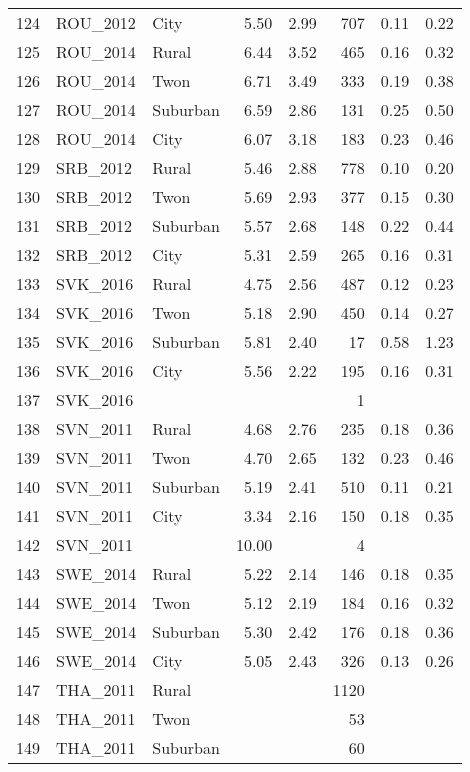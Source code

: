 \documentclass[12pt, titlepage]{article}
\begin{document}
\begin{table}[ht]
\begin{tabular}{rllrrrrr}
		124 & ROU\_2012 & City & 5.50 & 2.99 & 707 & 0.11 & 0.22 \\ 
		125 & ROU\_2014 & Rural & 6.44 & 3.52 & 465 & 0.16 & 0.32 \\ 
		126 & ROU\_2014 & Twon & 6.71 & 3.49 & 333 & 0.19 & 0.38 \\ 
		127 & ROU\_2014 & Suburban & 6.59 & 2.86 & 131 & 0.25 & 0.50 \\ 
		128 & ROU\_2014 & City & 6.07 & 3.18 & 183 & 0.23 & 0.46 \\ 
		129 & SRB\_2012 & Rural & 5.46 & 2.88 & 778 & 0.10 & 0.20 \\ 
		130 & SRB\_2012 & Twon & 5.69 & 2.93 & 377 & 0.15 & 0.30 \\ 
		131 & SRB\_2012 & Suburban & 5.57 & 2.68 & 148 & 0.22 & 0.44 \\ 
		132 & SRB\_2012 & City & 5.31 & 2.59 & 265 & 0.16 & 0.31 \\ 
		133 & SVK\_2016 & Rural & 4.75 & 2.56 & 487 & 0.12 & 0.23 \\ 
		134 & SVK\_2016 & Twon & 5.18 & 2.90 & 450 & 0.14 & 0.27 \\ 
		135 & SVK\_2016 & Suburban & 5.81 & 2.40 &  17 & 0.58 & 1.23 \\ 
		136 & SVK\_2016 & City & 5.56 & 2.22 & 195 & 0.16 & 0.31 \\ 
		137 & SVK\_2016 &  &  &  &   1 &  &  \\ 
		138 & SVN\_2011 & Rural & 4.68 & 2.76 & 235 & 0.18 & 0.36 \\ 
		139 & SVN\_2011 & Twon & 4.70 & 2.65 & 132 & 0.23 & 0.46 \\ 
		140 & SVN\_2011 & Suburban & 5.19 & 2.41 & 510 & 0.11 & 0.21 \\ 
		141 & SVN\_2011 & City & 3.34 & 2.16 & 150 & 0.18 & 0.35 \\ 
		142 & SVN\_2011 &  & 10.00 &  &   4 &  &  \\ 
		143 & SWE\_2014 & Rural & 5.22 & 2.14 & 146 & 0.18 & 0.35 \\ 
		144 & SWE\_2014 & Twon & 5.12 & 2.19 & 184 & 0.16 & 0.32 \\ 
		145 & SWE\_2014 & Suburban & 5.30 & 2.42 & 176 & 0.18 & 0.36 \\ 
		146 & SWE\_2014 & City & 5.05 & 2.43 & 326 & 0.13 & 0.26 \\ 
		147 & THA\_2011 & Rural &  &  & 1120 &  &  \\ 
		148 & THA\_2011 & Twon &  &  &  53 &  &  \\ 
		149 & THA\_2011 & Suburban &  &  &  60 &  &  \\ 

\end{tabular}
\end{table}
\end{document}
